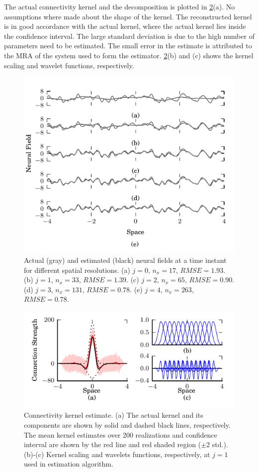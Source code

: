 \documentclass[journal]{IEEEtran}
\begin{document}
The actual connectivity kernel and the decomposition is plotted in \figurename{\ref{fig:KernelEstimate}}(a). No assumptions where made about the shape of the kernel. The reconstructed kernel is in good accordance with the actual kernel, where the actual kernel lies inside the confidence interval. The large standard deviation is due to the high number of parameters need to be estimated. The small error in the estimate is attributed to the MRA of the system used to form the estimator. \figurename{\ref{fig:KernelEstimate}}(b) and (c) shows the kernel scaling and wavelet functions, respectively.
\begin{figure}[!h] 
	\centering
		\includegraphics[scale=1]{./Graph/fig1.pdf}
		\caption{Actual (gray) and estimated (black) neural fields at a time instant for different spatial resolutions. (a) $j=0$, $n_x=17$, $RMSE = 1.93$. (b) $j=1$, $n_x=33$, $RMSE = 1.39$. (c) $j=2$, $n_x=65$, $RMSE = 0.90$. (d) $j=3$, $n_x=131$, $RMSE = 0.78$. (e) $j=4$, $n_x=263$, $RMSE=0.78$.}
	\label{fig:FieldEstimates}
\end{figure} 
\begin{figure}[!h] 
	\centering
		\includegraphics[scale=1]{./Graph/fig2.pdf}
		\caption{Connectivity kernel estimate. (a) The actual kernel and its components are shown by solid and dashed black lines, respectively. The mean kernel estimates over 200 realizations and confidence interval are shown by the red line and red shaded region ($\pm2$ std.). (b)-(c) Kernel scaling and wavelets functions, respectively, at $j=1$ used in estimation algorithm.}
	\label{fig:KernelEstimate}
\end{figure}
\end{document}
